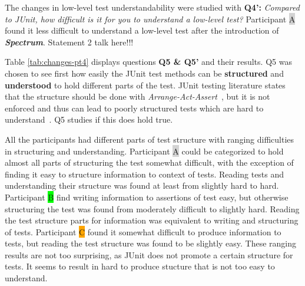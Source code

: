 The changes in low-level test understandability were studied with \textbf{Q4':} \textit{Compared to JUnit, how difficult is it
for you to understand a low-level test?} Participant {\colorbox{lightgray}A} found it less difficult to understand a low-level
test after the introduction of \textbf{\textit{Spectrum}}. Statement 2 talk here!!!

Table \ref{tab:changes-pt4} displays questions \textbf{Q5 \& Q5'} and their results. Q5 was chosen to see first
how easily the JUnit test methods can be \textbf{structured} and \textbf{understood} to hold different parts of the test. JUnit testing literature states that
the structure should be done with \textit{Arrange-Act-Assert}~\cite{langr2015pragmatic}, but it is not enforced and thus can lead to poorly structured
tests which are hard to understand~\cite{kapelonis2016java}. Q5 studies if this does hold true.

All the participants had different parts of test
structure with ranging difficulties in structuring and understanding. Participant {\colorbox{lightgray}A} could be categorized to hold almost all
parts of structuring the test somewhat difficult, with the exception of finding it easy to structure information to context of tests.
Reading tests and understanding their structure was found at least from slightly hard to hard.
Participant {\colorbox{lime}B} find writing information to assertions of test easy, but otherwise structuring the test
was found from moderately difficult to slightly hard. Reading the test structure parts for information was equivalent
to writing and structuring of tests. Participant {\colorbox{orange}C} found it somewhat difficult to produce information
to tests, but reading the test structure was found to be slightly easy. These ranging results are not too surprising,
as JUnit does not promote a certain structure for tests. It seems to result in hard to produce stucture that is not
too easy to understand.

